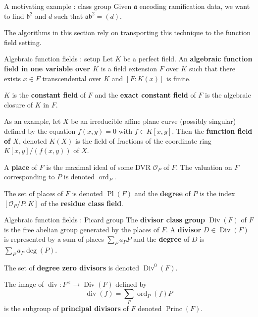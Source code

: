 \documentclass[xcolor=dvipsnames]{beamer}
\theoremstyle{plain}
\DeclareMathOperator{\Div}{Div}
\DeclareMathOperator{\Princ}{Princ}
\DeclareMathOperator{\ddiv}{div}
\DeclareMathOperator{\ord}{ord}
\DeclareMathOperator{\Pl}{Pl}
\begin{document}
{\begin{frame}{A motivating example : class group}
      Given $\mathfrak{a}$ encoding ramification data,
      we want to find $\mathfrak{b}^2$ and $d$
      such that $\mathfrak{a}\mathfrak{b}^2=(d)$.
      \pause\par
      The algorithms in this section
      rely on transporting this technique
      to the function field setting.
    \end{frame}
    \begin{frame}{Algebraic function fields : setup}
      Let $K$ be a perfect field.
      An \textbf{algebraic function field in one variable over $K$}
      is a field extension $F$ over $K$ such that there exists
      $x\in F$ transcendental over $K$ and
      $[F:K(x)]$ is finite.
      \pause\par
      $K$ is the \textbf{constant field} of $F$
      and the \textbf{exact constant field} of $F$
      is the algebraic closure of $K$ in $F$.
      \pause\par
      As an example,
      let $X$ be an irreducible affine plane curve
      (possibly singular)
      defined by the equation $f(x,y)=0$
      with $f\in K[x,y]$.
      Then the
      \textbf{function field of $X$},
      denoted $K(X)$ is the field of fractions
      of the coordinate ring $K[x,y]/(f(x,y))$
      of $X$.
      \pause\par
      A \textbf{place} of $F$ is the maximal ideal
      of some DVR
      $\mathcal{O}_P$ of $F$.
      The valuation on $F$ corresponding to $P$ is
      denoted $\ord_P$.
      \pause\par
      The set of places of $F$ is denoted
      $\Pl(F)$ and the \textbf{degree}
      of $P$ is the index
      $[\mathcal{O}_P/P:K]$ of the
      \textbf{residue class field}.
    \end{frame}
    \begin{frame}{Algebraic function fields : Picard group}
      The \textbf{divisor class group}
      $\Div(F)$ of $F$ is the free abelian group
      generated by the places of $F$.
      A \textbf{divisor} $D\in\Div(F)$ is represented by
      a sum of places $\sum_{P}a_PP$
      and the \textbf{degree}
      of $D$ is $\sum_{P}a_P\deg(P)$.
      \pause\par
      The set of \textbf{degree zero divisors} is denoted
      $\Div^0(F)$.
      \pause\par
      The image of $\ddiv\colon F^\times\to\Div(F)$ defined by
      \[
        \ddiv(f) = \sum_{P}\ord_P(f)P
      \]
      is the subgroup of
      \textbf{principal divisors} of $F$
      denoted $\Princ(F)$.

\end{frame}}
\end{document}
